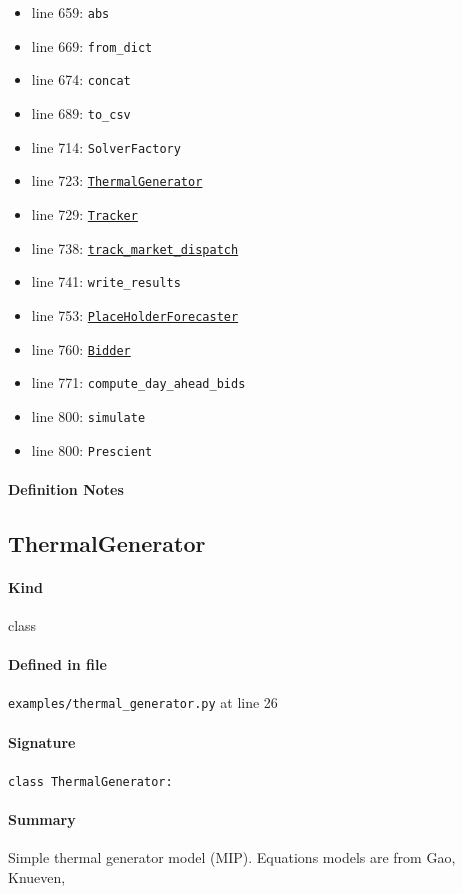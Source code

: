 \documentclass[11pt]{report}
\begin{document}
\begin{itemize}[leftmargin=*]
  \item line 659: \texttt{abs}
  \item line 669: \texttt{from\_dict}
  \item line 674: \texttt{concat}
  \item line 689: \texttt{to\_csv}
  \item line 714: \texttt{SolverFactory}
  \item line 723: \hyperref[def:examples-thermal_generator.py:ThermalGenerator:L26]{\texttt{ThermalGenerator}}
  \item line 729: \hyperref[def:tracker.py:Tracker:L19]{\texttt{Tracker}}
  \item line 738: \hyperref[def:tracker.py:Tracker.track_market_dispatch:L283]{\texttt{track\_market\_dispatch}}
  \item line 741: \texttt{write\_results}
  \item line 753: \hyperref[def:forecaster.py:PlaceHolderForecaster:L135]{\texttt{PlaceHolderForecaster}}
  \item line 760: \hyperref[def:bidder.py:Bidder:L1000]{\texttt{Bidder}}
  \item line 771: \texttt{compute\_day\_ahead\_bids}
  \item line 800: \texttt{simulate}
  \item line 800: \texttt{Prescient}
\end{itemize}
\paragraph{Definition Notes}
\subsection{ThermalGenerator}
\label{def:examples-thermal_generator.py:ThermalGenerator:L26}
\paragraph{Kind} class
\paragraph{Defined in file} \texttt{examples/thermal\_generator.py} at line 26
\paragraph{Signature} \texttt{class ThermalGenerator:}
\paragraph{Summary} Simple thermal generator model (MIP). Equations models are from Gao, Knueven,
\end{document}
